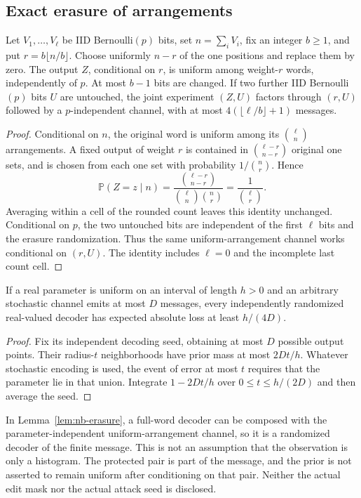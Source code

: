 \subsection{Exact erasure of arrangements}
\begin{lemma}\label{lem:nb-erasure}
Let $V_1,\ldots,V_\ell$ be IID Bernoulli$(p)$ bits, set
$n=\sum_iV_i$, fix an integer $b\geq1$, and put
$r=b\lfloor n/b\rfloor$.  Choose uniformly $n-r$ of the one positions
and replace them by zero.  The output $Z$, conditional on $r$, is uniform
among weight-$r$ words, independently of $p$.  At most $b-1$ bits are
changed.  If two further IID Bernoulli$(p)$ bits $U$ are untouched, the
joint experiment $(Z,U)$ factors through $(r,U)$ followed by a
$p$-independent channel, with at most
$4(\lfloor\ell/b\rfloor+1)$ messages.
\end{lemma}
\begin{proof}
Conditional on $n$, the original word is uniform among its
$\binom\ell n$ arrangements.  A fixed output of weight $r$ is contained
in $\binom{\ell-r}{n-r}$ original one sets, and is chosen from each one
set with probability $1/\binom nr$.  Hence
\[
 \mathbb P(Z=z\mid n)
 =\frac{\binom{\ell-r}{n-r}}{\binom\ell n\binom nr}
 =\frac1{\binom\ell r}.
\]
Averaging within a cell of the rounded count leaves this identity
unchanged.  Conditional on $p$, the two untouched bits are independent
of the first $\ell$ bits and the erasure randomization.  Thus the same
uniform-arrangement channel works conditional on $(r,U)$.
The identity includes $\ell=0$ and the incomplete last count cell.
\end{proof}

\begin{lemma}\label{nb:finite-message}
If a real parameter is uniform on an interval of length $h>0$ and an
arbitrary stochastic channel emits at most $D$ messages, every
independently randomized real-valued decoder has expected absolute loss
at least $h/(4D)$.
\end{lemma}
\begin{proof}
Fix its independent decoding seed, obtaining at most $D$ possible output
points.  Their radius-$t$ neighborhoods have prior mass at most $2Dt/h$.
Whatever stochastic encoding is used, the event of error at most $t$
requires that the parameter lie in that union.  Integrate
$1-2Dt/h$ over $0\leq t\leq h/(2D)$ and then average the seed.
\end{proof}
In Lemma~\ref{lem:nb-erasure}, a full-word decoder can be composed with
the parameter-independent uniform-arrangement channel, so it is a
randomized decoder of the finite message.  This is not an assumption
that the observation is only a histogram.  The protected pair is part
of the message, and the prior is not asserted to remain uniform after
conditioning on that pair.  Neither the actual edit mask nor the actual
attack seed is disclosed.

